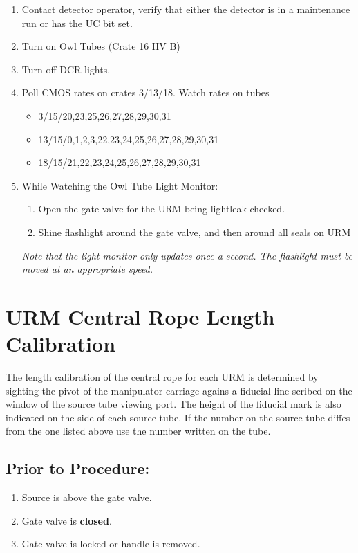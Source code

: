 \documentclass[11pt]{article}
\begin{document}
\begin{enumerate}
\item \CheckBox[name=ulc1]{} Contact detector operator, verify that either the detector
  is in a maintenance run or has the UC bit set.
\item \CheckBox[name=ulc2]{} Turn on Owl Tubes (Crate 16 HV B)
\item \CheckBox[name=ulc3]{} Turn off DCR lights.
\item \CheckBox[name=ulc4]{} Poll CMOS rates on crates 3/13/18. Watch rates on tubes 
\begin{itemize}
\item 3/15/20,23,25,26,27,28,29,30,31
\item 13/15/0,1,2,3,22,23,24,25,26,27,28,29,30,31
\item 18/15/21,22,23,24,25,26,27,28,29,30,31
\end{itemize}
\item \CheckBox[name=ulc5]{} While Watching the Owl Tube Light Monitor:
  \begin{enumerate}
  \item Open the gate valve for the URM being lightleak checked.
  \item Shine flashlight around the gate valve, 
         and then around all seals on URM
  \end{enumerate}
  \small
  {\em
    Note that the light monitor only updates once a second.  The
    flashlight must be moved at an appropriate speed.
  }
  \normalsize
\end{enumerate}

\section{URM Central Rope Length Calibration}

The length calibration of the central rope for each URM is determined by sighting the pivot of the manipulator carriage agains a fiducial line scribed on the window of the source tube viewing port. The height of the fiducial mark is also indicated on the side of each source tube. If the number on the source tube diffes from the one listed above use the number written on the tube.

\subsection{Prior to Procedure:}
\begin{enumerate}
\item Source is above the gate valve.
\item Gate valve is {\bf closed}.
\item Gate valve is locked or handle is removed.
\end{enumerate}
\end{document}
